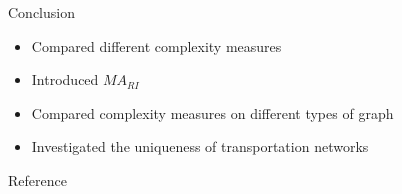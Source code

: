 \documentclass{beamer}
\begin{document}
    \begin{frame}{Conclusion}
        \begin{itemize}
            \item Compared different complexity measures
            \item Introduced $MA_{RI}$
            \item Compared complexity measures on different types of graph
            \item Investigated the uniqueness of transportation networks
        \end{itemize}
    \end{frame}

    \begin{frame}{Reference}
    \end{frame}
\end{document}
